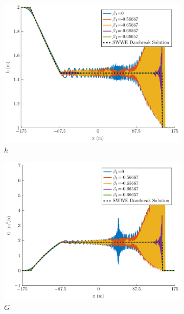 \documentclass[10pt]{elsarticle}
\begin{document}
\begin{figure}
	\centering
	\begin{subfigure}{0.32\textwidth}
		\centering
		\includegraphics[width=\textwidth]{./Figures/Simulations/Study/Serre2SWWECloser/h.pdf}
		\caption{$h$}
	\end{subfigure}
	\begin{subfigure}{0.32\textwidth}
		\centering
		\includegraphics[width=\textwidth]{./Figures/Simulations/Study/Serre2SWWECloser/G.pdf}
		\caption{$G$}
	\end{subfigure}
	\begin{subfigure}{0.32\textwidth}
	\centering

\end{subfigure}
\end{figure}
\end{document}
